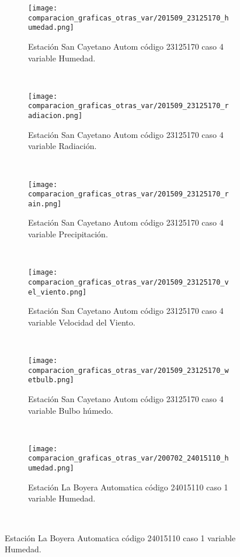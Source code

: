 \begin{figure}[H]
\centering
\begin{subfigure}[normla]{0.4\textwidth}
\caption{Estación San Cayetano Autom  código 23125170 caso 4 variable Humedad.}
\texttt{[image: comparacion\_graficas\_otras\_var/201509\_23125170\_humedad.png]}
\end{subfigure}
~
\begin{subfigure}[normla]{0.4\textwidth}
\caption{Estación San Cayetano Autom  código 23125170 caso 4 variable Radiación.}
\texttt{[image: comparacion\_graficas\_otras\_var/201509\_23125170\_radiacion.png]}
\end{subfigure}
~
\begin{subfigure}[normla]{0.4\textwidth}
\caption{Estación San Cayetano Autom  código 23125170 caso 4 variable Precipitación.}
\texttt{[image: comparacion\_graficas\_otras\_var/201509\_23125170\_rain.png]}
\end{subfigure}
~
\begin{subfigure}[normla]{0.4\textwidth}
\caption{Estación San Cayetano Autom  código 23125170 caso 4 variable Velocidad del Viento.}
\texttt{[image: comparacion\_graficas\_otras\_var/201509\_23125170\_vel\_viento.png]}
\end{subfigure}
~
\begin{subfigure}[normla]{0.4\textwidth}
\caption{Estación San Cayetano Autom  código 23125170 caso 4 variable Bulbo húmedo.}
\texttt{[image: comparacion\_graficas\_otras\_var/201509\_23125170\_wetbulb.png]}
\end{subfigure}
~
\begin{subfigure}[normla]{0.4\textwidth}
\caption{Estación La Boyera Automatica código 24015110 caso 1 variable Humedad.}
\texttt{[image: comparacion\_graficas\_otras\_var/200702\_24015110\_humedad.png]}
\end{subfigure}
~
\end{figure}
           
